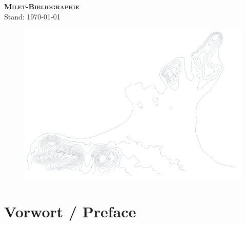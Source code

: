
\begin{titlepage}
    \vspace*{3cm}
\begin{center}
    {\LARGE \textsc{\textbf{Milet-Bibliographie}}}\\
    
    Stand: \today
\end{center}
\vspace*{3cm}
\begin{figure}[h]
    \includegraphics[width=\textwidth]{../data/figures/Gelaende2.png}
\end{figure}

\end{titlepage}

\thispagestyle{empty}

\chapter{Vorwort / Preface}
\nocite{*}



